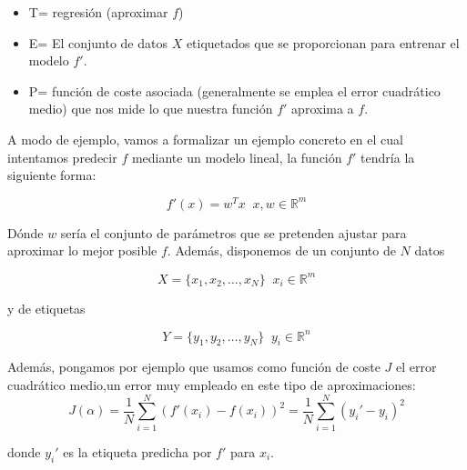             \begin{itemize}
                \item T= regresión (aproximar $f$)
                \item E= El conjunto de datos $X$ etiquetados que se proporcionan para entrenar el modelo $f'$.
                \item P= función de coste asociada (generalmente se emplea el error cuadrático medio) que nos mide lo  que nuestra función $f'$ aproxima a $f$.
            \end{itemize}
            
            \medskip 

            \noindent A modo de ejemplo, vamos a formalizar un ejemplo concreto en el cual intentamos predecir $f$ mediante un modelo lineal, la función $f'$ tendría la siguiente forma: 

            \begin{equation}
                f'(x)= w^T x \; \; x,w \in \mathbb{R}^m
            \end{equation}

            \noindent Dónde $w$ sería el conjunto de parámetros que se pretenden ajustar para aproximar lo mejor posible $f$. Además, disponemos de un conjunto de $N$ datos 
            
            \begin{equation}
                X= \lbrace x_1, x_2 , \ldots , x_N \rbrace \; \; x_i \in \mathbb{R}^m
            \end{equation}

            \noindent y de etiquetas 

            \begin{equation}
                Y= \lbrace y_1, y_2 , \ldots , y_N \rbrace \; \; y_i \in \mathbb{R}^n
            \end{equation}

            \noindent Además, pongamos por ejemplo que usamos como función de coste $J$ el error cuadrático medio,un error muy empleado en este tipo de aproximaciones:
            \begin{equation}
               J(\alpha)= \frac{1}{N} \sum_{i=1}^{N}(f'(x_i) - f(x_i))^2 = \frac{1}{N} \sum_{i=1}^{N}(y_i' - y_i)^2
            \end{equation}

            \noindent donde $y_i'$ es la etiqueta predicha por $f'$ para $x_i$.

            \medskip

